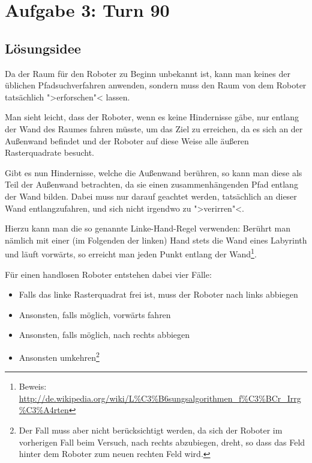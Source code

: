 \documentclass[10pt,a4paper]{article}
\begin{document}
\setcounter{section}{2}
\section{Aufgabe 3: Turn 90}

\subsection{Lösungsidee}

Da der Raum für den Roboter zu Beginn unbekannt ist, kann man keines der üblichen Pfadsuchverfahren anwenden, sondern muss den Raum von dem Roboter tatsächlich ">erforschen"< lassen.


Man sieht leicht, dass der Roboter, wenn es keine Hindernisse gäbe,  nur entlang der Wand des Raumes fahren müsste, um das Ziel zu erreichen, da es sich an der Außenwand befindet und der Roboter auf diese Weise alle äußeren Rasterquadrate besucht.

Gibt es nun Hindernisse, welche die Außenwand berühren, so kann man diese als Teil der Außenwand betrachten, da sie einen zusammenhängenden Pfad entlang der Wand bilden. %
Dabei muss nur darauf geachtet werden, tatsächlich an dieser Wand entlangzufahren, und sich nicht irgendwo zu ">verirren"<.


Hierzu kann man die so genannte Linke-Hand-Regel verwenden: Berührt man nämlich mit einer (im Folgenden der linken) Hand stets die Wand eines Labyrinth und läuft vorwärts, so erreicht man jeden Punkt entlang der Wand\footnote{Beweis: \url{http://de.wikipedia.org/wiki/L\%C3\%B6sungsalgorithmen_f\%C3\%BCr_Irrg\%C3\%A4rten}}.

Für einen handlosen Roboter entstehen dabei vier Fälle: 

\begin{itemize}
\item Falls das linke Rasterquadrat frei ist, muss der Roboter nach links abbiegen
\item Ansonsten, falls möglich, vorwärts fahren
\item Ansonsten, falls möglich, nach rechts abbiegen
\item Ansonsten umkehren\footnote{Der Fall muss aber nicht berücksichtigt werden, da sich der Roboter im vorherigen Fall beim Versuch, nach rechts abzubiegen, dreht, so dass das Feld hinter dem Roboter zum neuen rechten Feld wird.}
\end{itemize}
\end{document}
